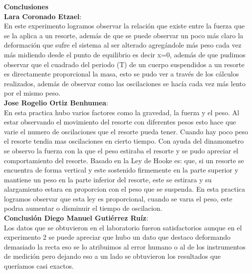 \documentclass[11pt,a4paper]{article}
\begin{document}
\begin{multicols}{2}
\textbf{{\normalsize Conclusiones}}\\
\textbf{Lara Coronado Etzael}:\\En este experimento logramos observar la relación que existe entre la fuerza que se la aplica a un resorte, además de que se puede observar un poco más claro la deformación que sufre el sistema al ser alterado agregándole  más peso cada vez más midiendo desde el punto de equilibrio es decir x=0, además de que pudimos observar  que el cuadrado del periodo (T) de un cuerpo suspendidos a un resorte es directamente proporcional  la masa, esto se pudo ver a través de los cálculos realizados, además de observar como las oscilaciones se hacía cada vez más lento por el mismo peso. \\
\textbf{Jose Rogelio  Ortiz Benhumea}:\\En esta practica hubo varios factores como la gravedad, la fuerza y el peso. Al estar observando el movimiento del resorte con diferentes pesos esto hace que varie el numero de oscilaciones que el resorte pueda tener. Cuando hay poco peso el resorte tendia mas oscilaciones en cierto tiempo. Con ayuda del dinamometro se observo la fuerza con la que el peso estiraba el resorte y se pudo apreciar el comportamiento del resorte. Basado en la Ley de Hooke es: que, si un resorte se encuentra de forma vertical y este sostenido firmemente en la parte superior y mantiene un peso en la parte inferior del resorte, este se estirara y su alargamiento estara en proporcion con el peso que se suspenda. En esta practica logramos observar que esta ley es proporcional, cuando se varıa el peso, este podrıa aumentar o disminuir el tiempo de oscilacion.\\
\textbf{Conclusión  Diego Manuel Gutiérrez Ruíz}:\\Los datos que se obtuvieron en el laboratorio fueron satisfactorios aunque en el experimento 2  se puede apreciar que hubo un dato  que destaco deformando demasiado la recta eso se lo atribuimos al error humano o al de los instrumentos de medición pero dejando eso a un lado se obtuvieron los resultados que queríamos casi exactos.\\


\end{multicols}
\end{document}
